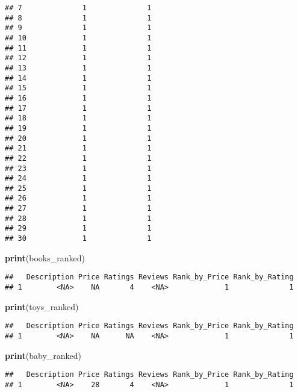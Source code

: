 \documentclass[
]{article}
\newenvironment{Shaded}{\begin{snugshade}}{\end{snugshade}}
\newcommand{\FunctionTok}[1]{\textcolor[rgb]{0.13,0.29,0.53}{\textbf{#1}}}
\newcommand{\NormalTok}[1]{#1}
\begin{document}
\begin{verbatim}
## 7              1              1
## 8              1              1
## 9              1              1
## 10             1              1
## 11             1              1
## 12             1              1
## 13             1              1
## 14             1              1
## 15             1              1
## 16             1              1
## 17             1              1
## 18             1              1
## 19             1              1
## 20             1              1
## 21             1              1
## 22             1              1
## 23             1              1
## 24             1              1
## 25             1              1
## 26             1              1
## 27             1              1
## 28             1              1
## 29             1              1
## 30             1              1
\end{verbatim}

\begin{Shaded}
\begin{Highlighting}[]
\FunctionTok{print}\NormalTok{(books\_ranked)}
\end{Highlighting}
\end{Shaded}

\begin{verbatim}
##   Description Price Ratings Reviews Rank_by_Price Rank_by_Rating
## 1        <NA>    NA       4    <NA>             1              1
\end{verbatim}

\begin{Shaded}
\begin{Highlighting}[]
\FunctionTok{print}\NormalTok{(toys\_ranked)}
\end{Highlighting}
\end{Shaded}

\begin{verbatim}
##   Description Price Ratings Reviews Rank_by_Price Rank_by_Rating
## 1        <NA>    NA      NA    <NA>             1              1
\end{verbatim}

\begin{Shaded}
\begin{Highlighting}[]
\FunctionTok{print}\NormalTok{(baby\_ranked)}
\end{Highlighting}
\end{Shaded}

\begin{verbatim}
##   Description Price Ratings Reviews Rank_by_Price Rank_by_Rating
## 1        <NA>    28       4    <NA>             1              1
\end{verbatim}
\end{document}
